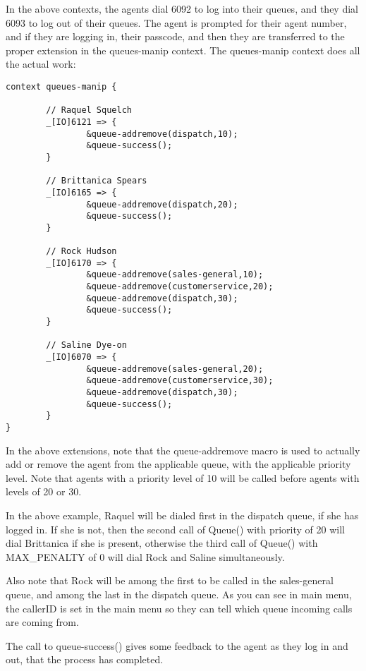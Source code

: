 In the above contexts, the agents dial 6092 to log into their queues,
and they dial 6093 to log out of their queues. The agent is prompted
for their agent number, and if they are logging in, their passcode, 
and then they are transferred to the proper extension in the 
queues-manip context.  The queues-manip context does all the 
actual work:

\begin{verbatim}
context queues-manip {

        // Raquel Squelch
        _[IO]6121 => {
                &queue-addremove(dispatch,10);
                &queue-success();
        }

        // Brittanica Spears
        _[IO]6165 => {
                &queue-addremove(dispatch,20);
                &queue-success();
        }

        // Rock Hudson
        _[IO]6170 => {
                &queue-addremove(sales-general,10);
                &queue-addremove(customerservice,20);
                &queue-addremove(dispatch,30);
                &queue-success();
        }

        // Saline Dye-on
        _[IO]6070 => {
                &queue-addremove(sales-general,20);
                &queue-addremove(customerservice,30);
                &queue-addremove(dispatch,30);
                &queue-success();
        }
}
\end{verbatim}

In the above extensions, note that the queue-addremove macro is used
to actually add or remove the agent from the applicable queue,
with the applicable priority level. Note that agents with a 
priority level of 10 will be called before agents with levels
of 20 or 30.

In the above example, Raquel will be dialed first in the dispatch
queue, if she has logged in. If she is not, then the second call of
Queue() with priority of 20 will dial Brittanica if she is present,
otherwise the third call of Queue() with MAX\_PENALTY of 0 will 
dial Rock and Saline simultaneously.

Also note that Rock will be among the first to be called in the sales-general 
queue, and among the last in the dispatch queue. As you can see in
main menu, the callerID is set in the main menu so they can tell 
which queue incoming calls are coming from.

The call to queue-success() gives some feedback to the agent
as they log in and out, that the process has completed.

